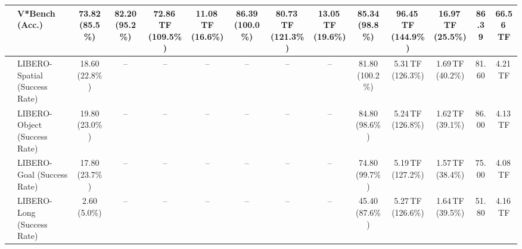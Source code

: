 \begin{table}[t]
\begin{center}
\begin{small}
\begin{sc}
{\begin{tabular}{llcccccccccccc}
& V*Bench (Acc.) & 73.82 (85.5\%) & 82.20 (95.2\%) & 72.86\,TF (109.5\%) & 11.08\,TF (16.6\%) & 86.39 (100.0\%) & 80.73\,TF (121.3\%) & 13.05\,TF (19.6\%) & 85.34 (98.8\%) & 96.45\,TF (144.9\%) & 16.97\,TF (25.5\%) & 86.39 & 66.56\,TF \\
\midrule\midrule
{}
& LIBERO-Spatial (Success Rate) & 18.60 (22.8\%) & -- & -- & -- & -- & -- & -- & 81.80 (100.2\%) & 5.31\,TF (126.3\%) & 1.69\,TF (40.2\%) & 81.60 & 4.21\,TF \\
& LIBERO-Object (Success Rate) & 19.80 (23.0\%) & -- & -- & -- & -- & -- & -- & 84.80 (98.6\%) & 5.24\,TF (126.8\%) & 1.62\,TF (39.1\%) & 86.00 & 4.13\,TF \\
& LIBERO-Goal (Success Rate) & 17.80 (23.7\%) & -- & -- & -- & -- & -- & -- & 74.80 (99.7\%) & 5.19\,TF (127.2\%) & 1.57\,TF (38.4\%) & 75.00 & 4.08\,TF \\
& LIBERO-Long (Success Rate) & 2.60 (5.0\%) & -- & -- & -- & -- & -- & -- & 45.40 (87.6\%) & 5.27\,TF (126.6\%) & 1.64\,TF (39.5\%) & 51.80 & 4.16\,TF \\
\bottomrule
\end{tabular}}
\end{sc}\end{small}\end{center}
\vspace{-0.22in}
\end{table}
